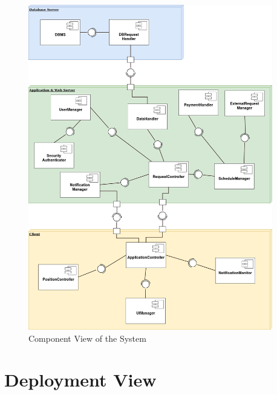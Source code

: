 \documentclass[numbers=noenddot, 12pt, a4paper, oneside]{scrbook}
\begin{document}
\begin{figure}[H]
	\centering
	\includegraphics[width=0.95\textwidth]{images/ComponentView}
	\caption{Component View of the System}
\end{figure}


\section{Deployment View}
\end{document}
